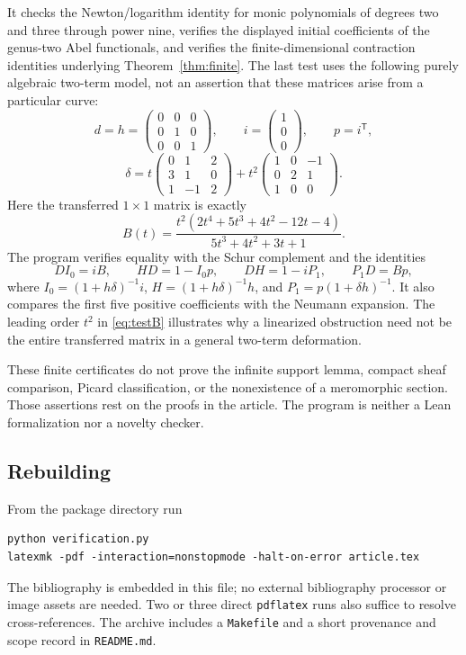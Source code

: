 \documentclass[11pt,letterpaper]{article}
\numberwithin{equation}{section}
\theoremstyle{definition}
\theoremstyle{remark}
\begin{document}
It checks the Newton/logarithm identity for monic polynomials of degrees
two and three through power nine, verifies the displayed initial
coefficients of the genus-two Abel functionals, and verifies the
finite-dimensional contraction identities underlying
Theorem~\ref{thm:finite}. The last test uses the following purely
algebraic two-term model, not an assertion that these matrices arise
from a particular curve:
\[
 d=h=\begin{pmatrix}0&0&0\\0&1&0\\0&0&1\end{pmatrix},\qquad
 i=\begin{pmatrix}1\\0\\0\end{pmatrix},\qquad p=i^{\mathsf T},
\]
\[
 \delta=t\begin{pmatrix}0&1&2\\3&1&0\\1&-1&2\end{pmatrix}
       +t^2\begin{pmatrix}1&0&-1\\0&2&1\\1&0&0\end{pmatrix}.
\]
Here the transferred $1\times1$ matrix is exactly
\begin{equation}
 B(t)=\frac{t^2(2t^4+5t^3+4t^2-12t-4)}
                  {5t^3+4t^2+3t+1}.
 \label{eq:testB}
\end{equation}
The program verifies equality with the Schur complement and the
identities
\[
 D I_0=iB,\qquad HD=1-I_0p,\qquad
 DH=1-iP_1,\qquad P_1D=Bp,
\]
where $I_0=(1+h\delta)^{-1}i$, $H=(1+h\delta)^{-1}h$, and
$P_1=p(1+\delta h)^{-1}$. It also compares the first five positive
coefficients with the Neumann expansion. The leading order $t^2$ in
\eqref{eq:testB} illustrates why a linearized obstruction need not be
the entire transferred matrix in a general two-term deformation.

These finite certificates do not prove the infinite support lemma,
compact sheaf comparison, Picard classification, or the nonexistence
of a meromorphic section. Those assertions rest on the proofs in the
article. The program is neither a Lean formalization nor a novelty
checker.

\subsection*{Rebuilding}
From the package directory run
\begin{verbatim}
python verification.py
latexmk -pdf -interaction=nonstopmode -halt-on-error article.tex
\end{verbatim}
The bibliography is embedded in this file; no external bibliography
processor or image assets are needed. Two or three direct
\texttt{pdflatex} runs also suffice to resolve cross-references.
The archive includes a \texttt{Makefile} and a short provenance and
scope record in \texttt{README.md}.
\end{document}
